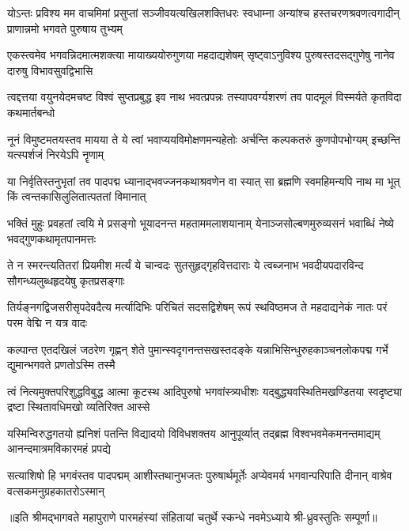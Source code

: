 
\fourlineindentedshloka
{योऽन्तः प्रविश्य मम वाचमिमां प्रसुप्तां}
{सञ्जीवयत्यखिलशक्तिधरः स्वधाम्ना}
{अन्यांश्च हस्तचरणश्रवणत्वगादीन्}
{प्राणान्नमो भगवते पुरुषाय तुभ्यम्}

\fourlineindentedshloka
{एकस्त्वमेव भगवन्निदमात्मशक्त्या}
{मायाख्ययोरुगुणया महदाद्यशेषम्}
{सृष्ट्वाऽनुविश्य पुरुषस्तदसद्गुणेषु}
{नानेव दारुषु विभावसुवद्विभासि}

\fourlineindentedshloka
{त्वद्दत्तया वयुनयेदमचष्ट विश्वं}
{सुप्तप्रबुद्ध इव नाथ भवत्प्रपन्नः}
{तस्यापवर्ग्यशरणं तव पादमूलं}
{विस्मर्यते कृतविदा कथमार्तबन्धो}

\fourlineindentedshloka
{नूनं विमुष्टमतयस्तव मायया ते}
{ये त्वां भवाप्ययविमोक्षणमन्यहेतोः}
{अर्चन्ति कल्पकतरुं कुणपोपभोग्यम्}
{इच्छन्ति यत्स्पर्शजं निरयेऽपि नॄणाम्}

\fourlineindentedshloka
{या निर्वृतिस्तनुभृतां तव पादपद्म}
{ध्यानाद्भवज्जनकथाश्रवणेन वा स्यात्}
{सा ब्रह्मणि स्वमहिमन्यपि नाथ मा भूत्}
{किं त्वन्तकासिलुलितात्पततां विमानात्}

\fourlineindentedshloka
{भक्तिं मुहुः प्रवहतां त्वयि मे प्रसङ्गो}
{भूयादनन्त महताममलाशयानाम्}
{येनाञ्जसोल्बणमुरुव्यसनं भवाब्धिं}
{नेष्ये भवद्गुणकथामृतपानमत्तः}

\fourlineindentedshloka
{ते न स्मरन्त्यतितरां प्रियमीश मर्त्यं}
{ये चान्वदः सुतसुहृद्गृहवित्तदाराः}
{ये त्वब्जनाभ भवदीयपदारविन्द}
{सौगन्ध्यलुब्धहृदयेषु कृतप्रसङ्गाः}

\fourlineindentedshloka
{तिर्यङ्नगद्विजसरीसृपदेवदैत्य}
{मर्त्यादिभिः परिचितं सदसद्विशेषम्}
{रूपं स्थविष्ठमज ते महदाद्यनेकं}
{नातः परं परम वेद्मि न यत्र वादः}

\fourlineindentedshloka
{कल्पान्त एतदखिलं जठरेण गृह्णन्}
{शेते पुमान्स्वदृगनन्तसखस्तदङ्के}
{यन्नाभिसिन्धुरुहकाञ्चनलोकपद्म}
{गर्भे द्युमान्भगवते प्रणतोऽस्मि तस्मै}

\fourlineindentedshloka
{त्वं नित्यमुक्तपरिशुद्धविबुद्ध आत्मा}
{कूटस्थ आदिपुरुषो भगवांस्त्र्यधीशः}
{यद्बुद्ध्यवस्थितिमखण्डितया स्वदृष्ट्या}
{द्रष्टा स्थितावधिमखो व्यतिरिक्त आस्से}

\fourlineindentedshloka
{यस्मिन्विरुद्धगतयो ह्यनिशं पतन्ति}
{विद्यादयो विविधशक्तय आनुपूर्व्यात्}
{तद्ब्रह्म विश्वभवमेकमनन्तमाद्यम्}
{आनन्दमात्रमविकारमहं प्रपद्ये}

\fourlineindentedshloka
{सत्याशिषो हि भगवंस्तव पादपद्मम्}
{आशीस्तथानुभजतः पुरुषार्थमूर्तेः}
{अप्येवमर्य भगवान्परिपाति दीनान्}
{वाश्रेव वत्सकमनुग्रहकातरोऽस्मान्}

{॥इति श्रीमद्भागवते महापुराणे पारमहंस्यां संहितायां चतुर्थे स्कन्धे नवमेऽध्याये श्री-ध्रुवस्तुतिः सम्पूर्णा॥}
